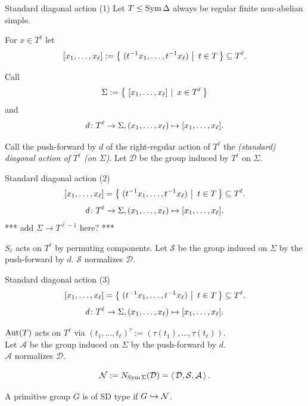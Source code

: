 \documentclass{beamer}
\theoremstyle{plain}
\theoremstyle{definition}
\newcommand{\todo}[1]{{\color{red}*** #1 ***}}
\begin{document}

\begin{frame}{Standard diagonal action (1)}
Let $T \leq \operatorname{Sym} \Delta$ always be regular finite
non-abelian simple.

For $x \in T ^ \ell$ let
\[
    [x_1, \ldots, x_\ell]
    :=
     \left\{ \left.\, (t ^ {-1} x_1, \ldots, t ^ {-1} x_\ell) ~\right|~ t \in T \,\right\} 
    \subseteq T ^ \ell.
\]

Call
\[
    \Sigma
    :=
     \left\{ \left.\,  [x_1, \ldots, x_\ell]  ~\right|~  x \in T ^ \ell  \,\right\} 
\]
and
\[
    d \colon T ^ \ell \rightarrow \Sigma,
    (x_1, \ldots, x_\ell)
    \mapsto
    [x_1, \ldots, x_\ell].
\]

\pause
Call the push-forward by $d$
of the right-regular action of $T ^ \ell$
the \emph{(standard) diagonal action of $T ^ \ell$ (on $\Sigma$)}.
Let $\mathcal D$ be the group induced by $T ^ \ell$ on $\Sigma$.
\end{frame}


\begin{frame}{Standard diagonal action (2)}
\[
    [x_1, \ldots, x_\ell]
    =
     \left\{ \left.\, (t ^ {-1} x_1, \ldots, t ^ {-1} x_\ell) ~\right|~ t \in T \,\right\} 
    \subseteq T ^ \ell.
\]
\[
    d \colon T ^ \ell \rightarrow \Sigma,
    (x_1, \ldots, x_\ell)
    \mapsto
    [x_1, \ldots, x_\ell].
\]
\todo{add $\Sigma \to T ^ {\ell - 1}$ here?}

$S_\ell$ acts on $T ^ \ell$ by permuting components.
Let $\mathcal S$ be the group induced on $\Sigma$ by the push-forward by $d$.
$\mathcal S$ normalizes $\mathcal D$.
\end{frame}

\begin{frame}{Standard diagonal action (3)}
\[
    [x_1, \ldots, x_\ell]
    =
     \left\{ \left.\, (t ^ {-1} x_1, \ldots, t ^ {-1} x_\ell) ~\right|~ t \in T \,\right\} 
    \subseteq T ^ \ell.
\]
\[
    d \colon T ^ \ell \rightarrow \Sigma,
    (x_1, \ldots, x_\ell)
    \mapsto
    [x_1, \ldots, x_\ell].
\]

$\operatorname{Aut}(T)$ acts on $T ^ \ell$ via
$(t_1, \ldots, t_\ell) ^ \tau := (\tau(t_1), \ldots, \tau(t_\ell))$.
\\
Let $\mathcal A$ be the group induced on $\Sigma$ by the push-forward by $d$.
\\
$\mathcal A$ normalizes $\mathcal D$.

\pause
\begin{equation}
\mathcal N := N_{\operatorname{Sym} \Sigma}(\mathcal D) =  \left\langle \, \mathcal D, \mathcal S, \mathcal A \, \right\rangle .
\end{equation}

A primitive group $G$ is of SD type if $G \hookrightarrow \mathcal N$.
\end{frame}
\end{document}
